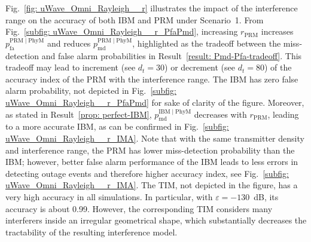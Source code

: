 \documentclass[12pt, draftclsnofoot, onecolumn]{IEEEtran}
\begin{document}
Fig.~\ref{fig: uWave_Omni_Rayleigh__r} illustrates the impact of the interference range on the accuracy of both IBM and PRM under Scenario~1. From Fig.~\ref{subfig: uWave_Omni_Rayleigh__r_PfaPmd}, increasing $r_{\text{PRM}}$ increases $p_{\mathrm{fa}}^{{\mathrm{PRM}} \mid {\mathrm{PhyM}}}$ and reduces $p_{\mathrm{md}}^{{\mathrm{PRM}} \mid {\mathrm{PhyM}}}$, highlighted as the tradeoff between the miss-detection and false alarm probabilities in Result~\ref{result: Pmd-Pfa-tradeoff}. This tradeoff may lead to increment (see $d_t = 30$) or decrement (see $d_t = 80$) of the accuracy index of the PRM with the interference range. The IBM has zero false alarm probability, not depicted in Fig.~\ref{subfig: uWave_Omni_Rayleigh__r_PfaPmd} for sake of clarity of the figure. Moreover, as stated in Result~\ref{prop: perfect-IBM}, $p_{\mathrm{md}}^{{\mathrm{IBM}} \mid {\mathrm{PhyM}}}$ decreases with $r_{\text{PRM}}$, leading to a more accurate IBM, as can be confirmed in Fig.~\ref{subfig: uWave_Omni_Rayleigh__r_IMA}. Note that with the same transmitter density and interference range, the PRM has lower miss-detection probability than the IBM; however, better false alarm performance of the IBM leads to less errors in detecting outage events and therefore higher accuracy index, see Fig.~\ref{subfig: uWave_Omni_Rayleigh__r_IMA}. The TIM, not depicted in the figure, has a very high accuracy in all simulations. In particular, with $\varepsilon = -130$~dB, its accuracy is about 0.99. However, the corresponding TIM considers many interferers inside an irregular geometrical shape, which substantially decreases the tractability of  the resulting interference model.
\end{document}
